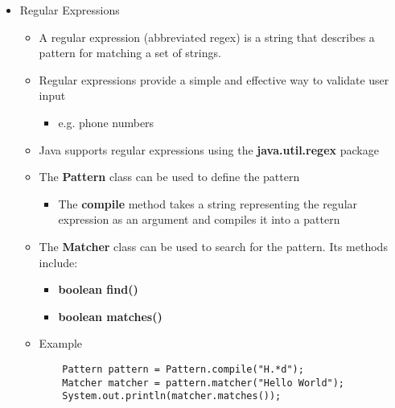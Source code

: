 \begin{itemize}
	\newpage

	\item Regular Expressions
	\begin{itemize}
		\item A regular expression (abbreviated regex) is a string that describes a pattern for matching a set of strings.
		\item Regular expressions provide a simple and effective way to validate user input
		\begin{itemize}
			\item e.g. phone numbers
		\end{itemize}
		\item Java supports regular expressions using the \textbf{java.util.regex} package
		\item The \textbf{Pattern} class can be used to define the pattern
		\begin{itemize}
			\item The \textbf{compile} method takes a string representing the regular expression as an argument and compiles it into a pattern
		\end{itemize}
		\item The \textbf{Matcher} class can be used to search for the pattern. Its methods include:
		\begin{itemize}
			\item \textbf{boolean find()}
			\item \textbf{boolean matches()}
		\end{itemize}
		\item Example
		\begin{Verbatim}
	Pattern pattern = Pattern.compile("H.*d");
	Matcher matcher = pattern.matcher("Hello World");
	System.out.println(matcher.matches());
		\end{Verbatim}
	\end{itemize}


\end{itemize}

